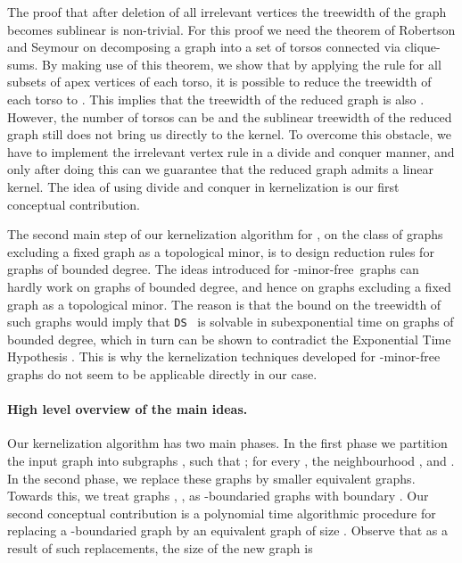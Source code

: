 \documentclass[11pt]{article}
\newcommand{\Hmf}{-minor-free}
\newcommand{\tDS}{{\texttt{\sc DS}}}
\begin{document}
The proof that after deletion of all irrelevant vertices the treewidth of the graph becomes sublinear is non-trivial.  For this proof we 
  need  the   theorem of Robertson and Seymour \cite{RobertsonS03}    on decomposing a graph into a set  of torsos connected via clique-sums. By making use of this theorem, we show that by applying the rule for all subsets of apex vertices of  each torso, it is possible to  reduce the treewidth  of each torso to . This implies that the treewidth of the reduced graph is also . However,  the number of torsos can be  and the sublinear treewidth of the reduced graph  still does not bring us directly to the kernel. To  overcome this obstacle, we have to implement the irrelevant vertex rule  in a divide and conquer manner, and only after doing this can we guarantee that the reduced graph admits a linear kernel.  The idea of using divide and conquer in kernelization is our first conceptual contribution. 
  









The second main step of our kernelization algorithm for , on  the class of graphs excluding a fixed graph  as a topological minor, is to design reduction rules for graphs of bounded degree. 
The ideas introduced for \Hmf \, graphs  can hardly  work on graphs of bounded degree, and hence on   graphs excluding a fixed graph  as a topological minor. The reason is that the bound  on the treewidth of such graphs   would imply that  \tDS
\, is solvable in subexponential time on graphs of bounded degree, which in turn can be shown to contradict the  Exponential Time Hypothesis       
\cite{ImpagliazzoPZ01}. This is why the kernelization techniques developed for \Hmf \, graphs do not seem to be applicable directly in our case.


\paragraph{High level overview of the main  ideas.}
Our kernelization algorithm has two main phases. In the first phase we partition the input graph  into subgraphs , such that 
 ; for every , the neighbourhood ,  and .   In the second phase, we replace these graphs by smaller equivalent graphs.  Towards this, we treat 
  graphs , ,  as -boundaried graphs with boundary . Our second  conceptual contribution is a  polynomial time algorithmic procedure for replacing a -boundaried graph by an equivalent graph of size .   Observe that as a result of such replacements, the size of the new graph is 
   
\end{document}
